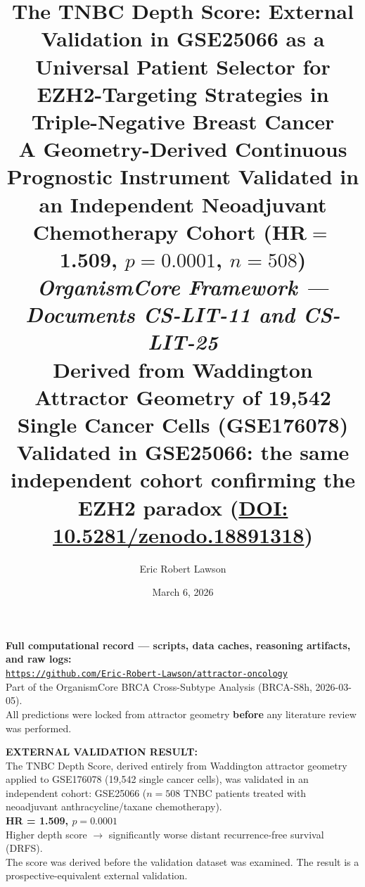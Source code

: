 \documentclass[12pt, a4paper]{article}
\title{
    \vspace{-1em}
    \textbf{The TNBC Depth Score: External Validation
    in GSE25066 as a Universal Patient Selector for
    EZH2-Targeting Strategies in Triple-Negative
    Breast Cancer}\\[0.5em]
    \large A Geometry-Derived Continuous Prognostic
    Instrument Validated in an Independent
    Neoadjuvant Chemotherapy Cohort
    (HR$=$1.509, $p=0.0001$, $n=508$)\\[0.4em]
    \normalsize \textit{OrganismCore Framework ---
    Documents CS-LIT-11 and CS-LIT-25}\\[0.3em]
    \small Derived from Waddington Attractor Geometry
    of 19,542 Single Cancer Cells (GSE176078)\\[0.3em]
    \small Validated in GSE25066: the same independent
    cohort confirming the EZH2 paradox
    (\href{https://doi.org/10.5281/zenodo.18891318}
    {DOI: 10.5281/zenodo.18891318})
}
\author[1]{Eric Robert Lawson}
\affil[1]{
    OrganismCore\\
    \href{mailto:OrganismCore@proton.me}
         {OrganismCore@proton.me}\\
    ORCID:
    \href{https://orcid.org/0009-0002-0414-6544}
         {0009-0002-0414-6544}
}
\date{March 6, 2026}
\begin{document}

\maketitle
\thispagestyle{fancy}

\begin{center}
\colorbox{repobox}{
\begin{minipage}{0.88\textwidth}
\vspace{0.5em}
\centering
\textbf{Full computational record --- scripts, data
caches, reasoning artifacts, and raw logs:}\\[0.4em]
\href{https://github.com/Eric-Robert-Lawson/attractor-oncology}
{\texttt{https://github.com/Eric-Robert-Lawson/attractor-oncology}}
\\[0.3em]
\small Part of the OrganismCore BRCA Cross-Subtype
Analysis (BRCA-S8h, 2026-03-05).\\
All predictions were locked from attractor geometry
\textbf{before} any literature review was performed.
\vspace{0.5em}
\end{minipage}}
\end{center}

\vspace{1em}

\begin{center}
\colorbox{validationbox}{
\begin{minipage}{0.88\textwidth}
\vspace{0.5em}
\textbf{EXTERNAL VALIDATION RESULT:}\\[0.4em]
The TNBC Depth Score, derived entirely from
Waddington attractor geometry applied to
GSE176078 (19,542 single cancer cells), was
validated in an independent cohort:
GSE25066 ($n = 508$ TNBC patients treated with
neoadjuvant anthracycline/taxane chemotherapy).\\[0.4em]
\textbf{HR = 1.509, $p = 0.0001$}\\[0.3em]
Higher depth score $\rightarrow$ significantly
worse distant recurrence-free survival (DRFS).\\[0.3em]
The score was derived before the validation dataset
was examined. The result is a prospective-equivalent
external validation.
\vspace{0.5em}
\end{minipage}}
\end{center}
\end{document}
